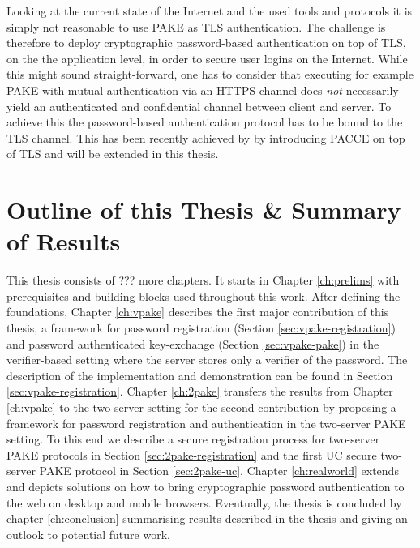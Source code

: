 Looking at the current state of the Internet and the used tools and protocols it is simply not reasonable to use \ac{PAKE} as \ac{TLS} authentication.
The challenge is therefore to deploy cryptographic password-based authentication on top of \ac{TLS}, \ie on the the application level, in order to secure user logins on the Internet.
While this might sound straight-forward, one has to consider that executing for example \ac{PAKE} with mutual authentication via an \ac{HTTPS} channel does \emph{not} necessarily yield an authenticated and confidential channel between client and server.
To achieve this the password-based authentication protocol has to be bound to the \ac{TLS} channel.
This has been recently achieved by \citet{MSD13} by introducing \ac{PACCE} on top of \ac{TLS} and will be extended in this thesis.


\section{Outline of this Thesis \& Summary of Results}\label{sec:intro:outline}
This thesis consists of ??? more chapters.
It starts in Chapter \ref{ch:prelims} with prerequisites and building blocks used throughout this work.
After defining the foundations, Chapter \ref{ch:vpake} describes the first major contribution of this thesis, a framework for password registration (Section \ref{sec:vpake-registration}) and password authenticated key-exchange (Section \ref{sec:vpake-pake}) in the verifier-based setting where the server stores only a verifier of the password.
The description of the implementation and demonstration can be found in Section \ref{sec:vpake-registration}.
Chapter \ref{ch:2pake} transfers the results from Chapter \ref{ch:vpake} to the two-server setting for the second contribution by proposing a framework for password registration and authentication in the two-server \ac{PAKE} setting.
To this end we describe a secure registration process for two-server \ac{PAKE} protocols in Section \ref{sec:2pake-registration} and the first \ac{UC} secure two-server \ac{PAKE} protocol in Section \ref{sec:2pake-uc}.
Chapter \ref{ch:realworld} extends \cite{MSD13} and depicts solutions on how to bring cryptographic password authentication to the web on desktop and mobile browsers.
Eventually, the thesis is concluded by chapter \ref{ch:conclusion} summarising results described in the thesis and giving an outlook to potential future work.



